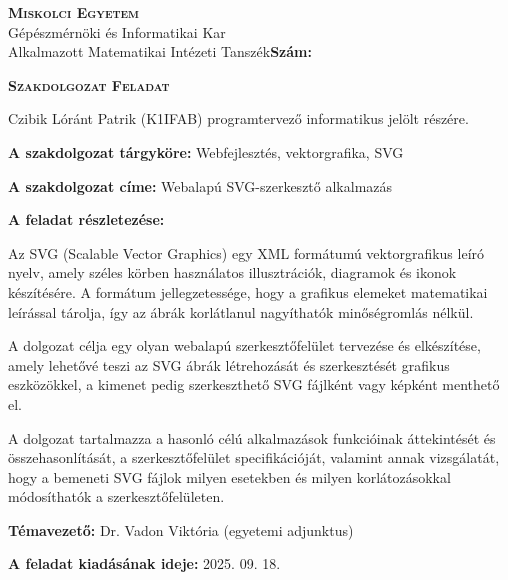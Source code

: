 \noindent
\textsc{\textbf{Miskolci Egyetem}}\\
Gépészmérnöki és Informatikai Kar\\
Alkalmazott Matematikai Intézeti Tanszék\hspace*{4cm}\hfil \textbf{Szám:}

\vspace{0.5cm}
\begin{center}
\large\textsc{\textbf{Szakdolgozat Feladat}}
\end{center}
\vspace{0.5cm}

Czibik Lóránt Patrik (K1IFAB) programtervező informatikus jelölt részére.

\bigskip
\noindent\textbf{A szakdolgozat tárgyköre:} Webfejlesztés, vektorgrafika, SVG

\bigskip
\noindent\textbf{A szakdolgozat címe:} Webalapú SVG-szerkesztő alkalmazás

\bigskip
\noindent\textbf{A feladat részletezése:}

\medskip
Az SVG (Scalable Vector Graphics) egy XML formátumú vektorgrafikus leíró nyelv, amely széles körben használatos illusztrációk, diagramok és ikonok készítésére. A formátum jellegzetessége, hogy a grafikus elemeket matematikai leírással tárolja, így az ábrák korlátlanul nagyíthatók minőségromlás nélkül.

\medskip
A dolgozat célja egy olyan webalapú szerkesztőfelület tervezése és elkészítése, amely lehetővé teszi az SVG ábrák létrehozását és szerkesztését grafikus eszközökkel, a kimenet pedig szerkeszthető SVG fájlként vagy képként menthető el.

\medskip
A dolgozat tartalmazza a hasonló célú alkalmazások funkcióinak áttekintését és összehasonlítását, a szerkesztőfelület specifikációját, valamint annak vizsgálatát, hogy a bemeneti SVG fájlok milyen esetekben és milyen korlátozásokkal módosíthatók a szerkesztőfelületen.

\vfill

\noindent\textbf{Témavezető:} Dr. Vadon Viktória (egyetemi adjunktus)


\bigskip
\noindent\textbf{A feladat kiadásának ideje:} 2025. 09. 18.


